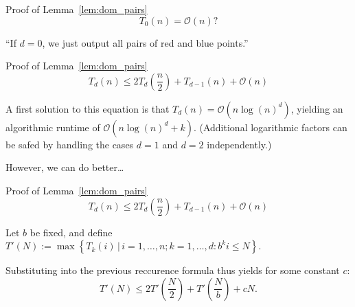 \begin{frame}{Proof of Lemma~\ref{lem:dom_pairs}}
    \[
        T_0(n) = \mathcal{O}\left( n \right)?
    \]

    ``If $d = 0$, we just output all pairs of red and blue points.''



\end{frame}

\begin{frame}{Proof of Lemma~\ref{lem:dom_pairs}}
    \[
        T_d(n) \leq 2 T_d\left( \frac{n}{2} \right) + T_{d - 1}(n) + \mathcal{O}(n)
    \]

    A first solution to this equation is that $T_d(n) = \mathcal{O}\left( n {\log(n)}^d \right)$, yielding an algorithmic runtime of $\mathcal{O}\left( n {\log(n)}^d + k \right)$. (Additional logarithmic factors can be safed by handling the cases $d = 1$ and $d = 2$ independently.\footnotemark[1]{})

    However, we can do better\dots
\end{frame}

\begin{frame}{Proof of Lemma~\ref{lem:dom_pairs}}
    \[
        T_d(n) \leq 2 T_d\left( \frac{n}{2} \right) + T_{d - 1}(n) + \mathcal{O}(n)
    \]

    Let $b$ be fixed, and define $T'(N) := \max \left\{ T_k(i) \,|\, i = 1, \dots, n; k = 1, \dots, d: b^k i \leq N \right\}$.
    
    Substituting into the previous reccurence formula thus yields for some constant $c$:
    \[
        T'(N) \leq 2 T'\left( \frac{N}{2} \right) + T'\left( \frac{N}{b} \right) + cN.
    \]
    
\end{frame}

